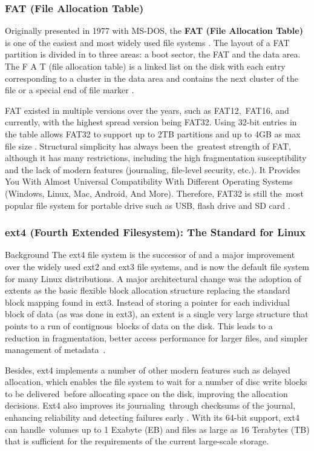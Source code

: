 \documentclass[12pt]{article}
\begin{document}
\subsubsection{FAT (File Allocation Table)}
Originally presented in 1977 with MS-DOS, the \textbf{FAT (File Allocation Table)} is one of the easiest and most widely used file systems \parencite{Bundele2018}. The layout of a FAT partition is divided in to three areas: a boot sector, the FAT and the data area. The F A T (file allocation table) is a linked list on the disk with each entry corresponding to a cluster in the data area and contains the next cluster of the file or a special end of file marker \parencite{Tanenbaum2014}.

FAT existed in multiple versions over the years, such as FAT12, FAT16, and currently, with the highest spread version being FAT32. Using 32-bit entries in the table allows FAT32 to support up to 2TB partitions and up to 4GB as max file size \parencite{Bundele2018}. Structural simplicity has always been the greatest strength of FAT, although it has many restrictions, including the high fragmentation susceptibility and the lack of modern features (journaling, file-level security, etc.). It Provides You With Almost Universal Compatibility With Different Operating Systems (Windows, Linux, Mac, Android, And More). Therefore, FAT32 is still the most popular file system for portable drive such as USB, flash drive and SD card \parencite{Dhjaku2019}. 

\subsubsection{ext4 (Fourth Extended Filesystem): The Standard for Linux}
Background The ext4 file system is the successor of and a major improvement over the widely used ext2 and ext3 ﬁle systems, and is now the default ﬁle system for many Linux distributions. A major architectural change was the adoption of extents as the basic ﬂexible block allocation structure replacing the standard block mapping found in ext3. Instead of storing a pointer for each individual block of data (as was done in ext3), an extent is a single very large structure that points to a run of contiguous blocks of data on the disk. This leads to a reduction in fragmentation, better access performance for larger ﬁles, and simpler management of metadata \parencite{Dhjaku2019}. 

Besides, ext4 implements a number of other modern features such as delayed allocation, which enables the file system to wait for a number of disc write blocks to be delivered before allocating space on the disk, improving the allocation decisions. Ext4 also improves its journaling through checksums of the journal, enhancing reliability and detecting failures early \parencite{Dhjaku2019}. With its 64-bit support, ext4 can handle volumes up to 1 Exabyte (EB) and files as large as 16 Terabytes (TB) that is sufficient for the requirements of the current large-scale storage.
\end{document}
